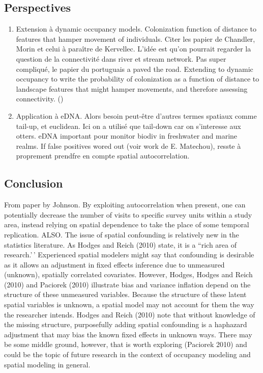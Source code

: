 \documentclass[
  11pt,
  a4paper,
]{article}
\begin{document}
\subsection{Perspectives}\label{perspectives}

\begin{enumerate}
\def\labelenumi{\arabic{enumi}.}
\item
  Extension à dynamic occupancy models. Colonization function of distance to features that hamper movement of individuals. Citer les papier de Chandler, Morin et celui à paraître de Kervellec. L'idée est qu'on pourrait regarder la question de la connectivité dans river et stream network. Pas super compliqué, le papier du portuguais a paved the road. Extending to dynamic occupancy to write the probability of colonization as a function of distance to landscape features that might hamper movements, and therefore assessing connectivity. ()
\item
  Application à eDNA. Alors besoin peut-être d'autres termes spatiaux comme tail-up, et euclidean. Ici on a utilisé que tail-down car on s'interesse aux otters. eDNA important pour monitor biodiv in freshwater and marine realms. If false positives wored out (voir work de E. Matechou), resste à proprement prendfre en compte spatial autocorrelation.
\end{enumerate}

\subsection{Conclusion}\label{conclusion}

From paper by Johnson. By exploiting autocorrelation when present, one can potentially decrease the number of visits to specific survey units
within a study area, instead relying on spatial dependence to take the place of some temporal replication.
ALSO. The issue of spatial confounding is relatively new in
the statistics literature. As Hodges and Reich (2010)
state, it is a ``rich area of research.'\,' Experienced spatial
modelers might say that confounding is desirable as it
allows an adjustment in fixed effects inference due to
unmeasured (unknown), spatially correlated covariates.
However, Hodges, Hodges and Reich (2010) and
Paciorek (2010) illustrate bias and variance inflation
depend on the structure of these unmeasured variables.
Because the structure of these latent spatial variables is
unknown, a spatial model may not account for them the
way the researcher intends. Hodges and Reich (2010)
note that without knowledge of the missing structure,
purposefully adding spatial confounding is a haphazard
adjustment that may bias the known fixed effects in
unknown ways. There may be some middle ground,
however, that is worth exploring (Paciorek 2010) and
could be the topic of future research in the context of
occupancy modeling and spatial modeling in general.
\end{document}
